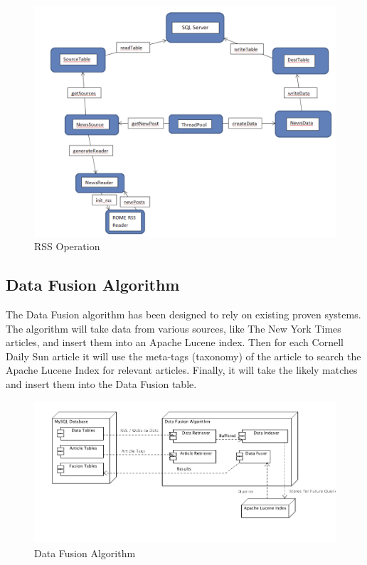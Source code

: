 \documentclass[12pt]{article} %
\begin{document}
\begin{figure}[htbp]
\begin{center}
\includegraphics[width=6in]{images/rss_diag}
\caption{RSS Operation}
\end{center}
\end{figure}

\subsection{Data Fusion Algorithm}

The Data Fusion algorithm has been designed to rely on existing proven systems. The algorithm will take data from various sources, like The New York Times articles, and insert them into an Apache Lucene index. Then for each Cornell Daily Sun article it will use the meta-tags (taxonomy) of the article to search the Apache Lucene Index for relevant articles. Finally, it will take the likely matches and insert them into the Data Fusion table.

\begin{figure}[htbp]
\begin{center}
\includegraphics[width=6in]{images/data_fusion_alg}
\caption{Data Fusion Algorithm}
\end{center}
\end{figure}
\end{document}
